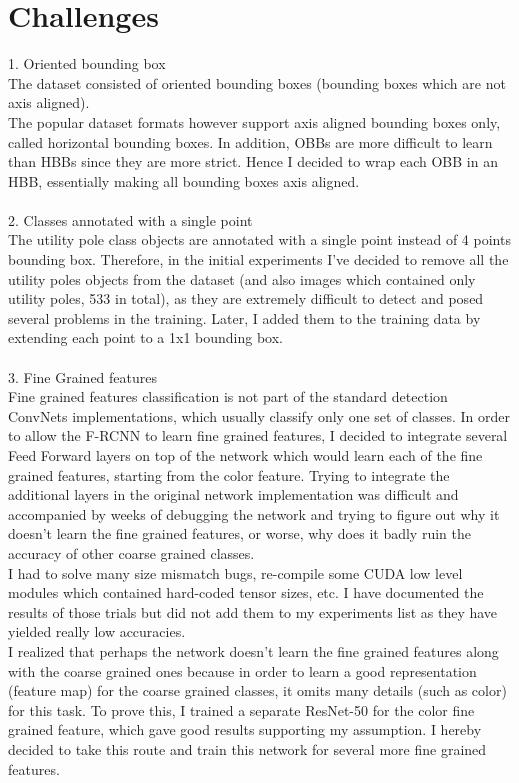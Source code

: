 \documentclass[]{article}
\begin{document}
\section{Challenges}
1. Oriented bounding box \\
The dataset consisted of oriented bounding boxes (bounding boxes which are not axis aligned). \\
The popular dataset formats however support axis aligned bounding boxes only, called horizontal bounding boxes. 
In addition, OBBs are more difficult to learn than HBBs since they are more strict. Hence I decided to wrap each OBB in an HBB, essentially making all bounding boxes axis aligned.  
\\\\
2. Classes annotated with a single point\\
The utility pole class objects are annotated with a single point instead of 4 points bounding box. Therefore, in the initial experiments I've decided to remove all the utility poles objects from the dataset (and also images which contained only utility poles, 533 in total), as they are extremely difficult to detect and posed several problems in the training. Later, I added them to the training data by extending each point to a 1x1 bounding box.
\\\\
3. Fine Grained features\\
Fine grained features classification is not part of the standard detection ConvNets implementations, which usually classify only one set of classes.
In order to allow the F-RCNN \cite{fasterrcnn} to learn fine grained features, I decided to integrate several Feed Forward layers on top of the network which would learn each of the fine grained features, starting from the color feature.
Trying to integrate the additional layers in the original network implementation was difficult and accompanied by weeks of debugging the network and trying to figure out why it doesn't learn the fine grained features, or worse, why does it badly ruin the accuracy of other coarse grained classes.\\
I had to solve many size mismatch bugs, re-compile some CUDA low level modules which contained hard-coded tensor sizes, etc.
I have documented the results of those trials but did not add them to my experiments list as they have yielded really low accuracies.\\
I realized that perhaps the network doesn't learn the fine grained features along with the coarse grained ones because in order to learn a good representation (feature map) for the coarse grained classes, it omits many details (such as color) for this task. To prove this, I trained a separate ResNet-50 \cite{resnet} for the color fine grained feature, which gave good results supporting my assumption. I hereby decided to take this route and train this network for several more fine grained features.
\end{document}

